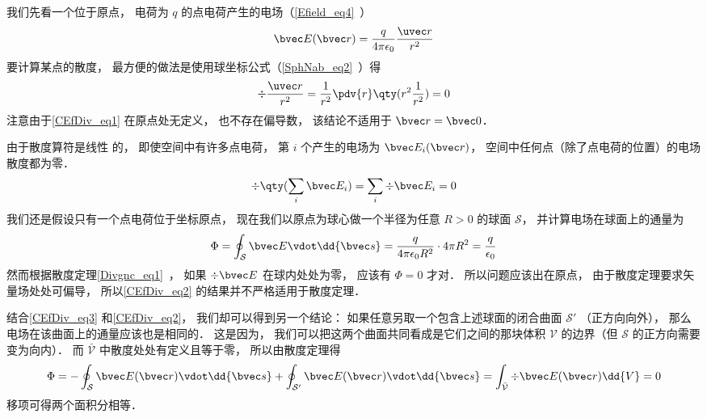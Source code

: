 

我们先看一个位于原点， 电荷为 $q$ 的点电荷产生的电场（\autoref{Efield_eq4}~）
\begin{equation}\label{CEfDiv_eq1}
\bvec E(\bvec r) = \frac{q}{4\pi\epsilon_0}\frac{\uvec r}{r^2}
\end{equation}
要计算某点的散度， 最方便的做法是使用球坐标公式（\autoref{SphNab_eq2}~）得
\begin{equation}
\div \frac{\uvec r}{r^2} = \frac{1}{r^2} \pdv{r} \qty(r^2 \frac{1}{r^2}) = 0
\end{equation}
注意由于\autoref{CEfDiv_eq1} 在原点处无定义， 也不存在偏导数， 该结论不适用于 $\bvec r = \bvec 0$．

由于散度算符是线性%
的， 即使空间中有许多点电荷， 第 $i$ 个产生的电场为 $\bvec E_i(\bvec r)$， 空间中任何点（除了点电荷的位置）的电场散度都为零．
\begin{equation}\label{CEfDiv_eq3}
\div \qty(\sum_i \bvec E_i) = \sum_i \div \bvec E_i = 0
\end{equation}
我们还是假设只有一个点电荷位于坐标原点， 现在我们以原点为球心做一个半径为任意 $R > 0$ 的球面 $\mathcal S$， 并计算电场在球面上的通量为
\begin{equation}\label{CEfDiv_eq2}
\Phi = \oint_{\mathcal S} \bvec E \vdot \dd{\bvec s} = \frac{q}{4\pi\epsilon_0 R^2} \cdot 4\pi R^2 = \frac{q}{\epsilon_0}
\end{equation}
然而根据散度定理\autoref{Divgnc_eq1}~， 如果 $\div \bvec E$ 在球内处处为零， 应该有 $\Phi = 0$ 才对． 所以问题应该出在原点， 由于散度定理要求矢量场处处可偏导， 所以\autoref{CEfDiv_eq2} 的结果并不严格适用于散度定理．

结合\autoref{CEfDiv_eq3} 和\autoref{CEfDiv_eq2}， 我们却可以得到另一个结论： 如果任意另取一个包含上述球面的闭合曲面 $\mathcal S'$ （正方向向外）， 那么电场在该曲面上的通量应该也是相同的． 这是因为， 我们可以把这两个曲面共同看成是它们之间的那块体积 $\mathcal V$ 的边界（但 $\mathcal S$ 的正方向需要变为向内）． 而 $\bar{\mathcal V}$ 中散度处处有定义且等于零， 所以由散度定理得
\begin{equation}
\Phi = -\oint_{\mathcal S} \bvec E(\bvec r) \vdot \dd{\bvec s} + \oint_{\mathcal S'} \bvec E(\bvec r)\vdot \dd{\bvec s} = \int_{\bar{\mathcal V}} \div \bvec E(\bvec r) \dd{V} = 0
\end{equation}
移项可得两个面积分相等．

